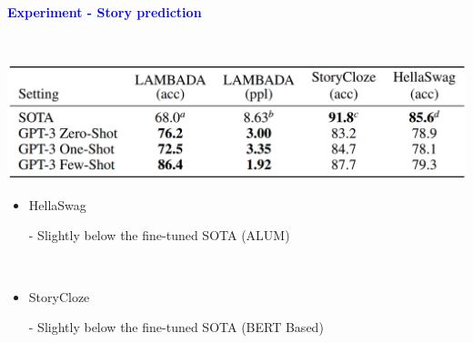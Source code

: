 \documentclass[professionalfont]{beamer}
\begin{document}
\begin{frame}
\begin{center}
    { \textbf{\textcolor{blue}{ {\fontsize{12}{14}\selectfont Experiment - Story prediction} }} }
\end{center}
\\[0.5cm]

\begin{center}
    \includegraphics[width=1.0\textwidth]{table/3-2.png}
\end{center}

{\fontsize{10}{14}\selectfont 
\begin{itemize}
    \item HellaSwag

    - Slightly below the fine-tuned SOTA (ALUM)

    \\[0.3cm]

    \item StoryCloze
    
    - Slightly below the fine-tuned SOTA (BERT Based)

\end{itemize}
}

\end{frame}
\end{document}
